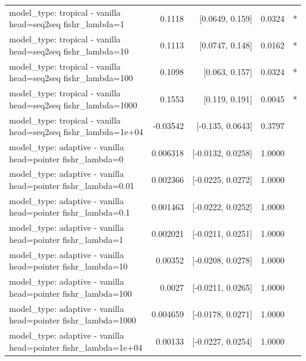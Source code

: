 \documentclass[10pt]{article}
\makeatletter
\newcommand{\stackcell}[1]{\begin{tabular}[t]{@{}l@{}}#1\end{tabular}}
\makeatother
\begin{document}
{\begin{longtable}{lrrrl}
\stackcell{model\_type: tropical - vanilla\\\footnotesize head=seq2seq fishr\_lambda=1 } & 0.1118 & [0.0649, 0.159] & 0.0324 & *\\
\stackcell{model\_type: tropical - vanilla\\\footnotesize head=seq2seq fishr\_lambda=10 } & 0.1113 & [0.0747, 0.148] & 0.0162 & *\\
\stackcell{model\_type: tropical - vanilla\\\footnotesize head=seq2seq fishr\_lambda=100 } & 0.1098 & [0.063, 0.157] & 0.0324 & *\\
\stackcell{model\_type: tropical - vanilla\\\footnotesize head=seq2seq fishr\_lambda=1000 } & 0.1553 & [0.119, 0.191] & 0.0045 & *\\
\stackcell{model\_type: tropical - vanilla\\\footnotesize head=seq2seq fishr\_lambda=1e+04 } & -0.03542 & [-0.135, 0.0643] & 0.3797 & \\
\stackcell{model\_type: adaptive - vanilla\\\footnotesize head=pointer fishr\_lambda=0 } & 0.006318 & [-0.0132, 0.0258] & 1.0000 & \\
\stackcell{model\_type: adaptive - vanilla\\\footnotesize head=pointer fishr\_lambda=0.01 } & 0.002366 & [-0.0225, 0.0272] & 1.0000 & \\
\stackcell{model\_type: adaptive - vanilla\\\footnotesize head=pointer fishr\_lambda=0.1 } & 0.001463 & [-0.0222, 0.0252] & 1.0000 & \\
\stackcell{model\_type: adaptive - vanilla\\\footnotesize head=pointer fishr\_lambda=1 } & 0.002021 & [-0.0211, 0.0251] & 1.0000 & \\
\stackcell{model\_type: adaptive - vanilla\\\footnotesize head=pointer fishr\_lambda=10 } & 0.00352 & [-0.0208, 0.0278] & 1.0000 & \\
\stackcell{model\_type: adaptive - vanilla\\\footnotesize head=pointer fishr\_lambda=100 } & 0.0027 & [-0.0211, 0.0265] & 1.0000 & \\
\stackcell{model\_type: adaptive - vanilla\\\footnotesize head=pointer fishr\_lambda=1000 } & 0.004659 & [-0.0178, 0.0271] & 1.0000 & \\
\stackcell{model\_type: adaptive - vanilla\\\footnotesize head=pointer fishr\_lambda=1e+04 } & 0.00133 & [-0.0227, 0.0254] & 1.0000 & \\

\end{longtable}}
\end{document}
